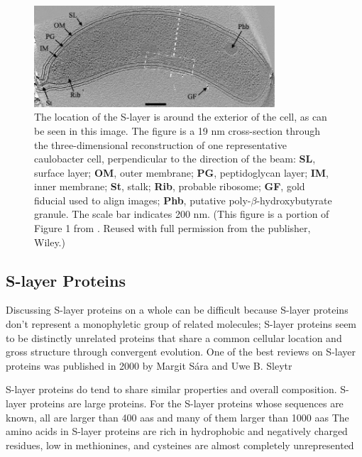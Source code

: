 \begin{figure}[htb]
  \begin{center}
    \includegraphics[width=0.8\textwidth]{intro/img/jensentomograph.jpg}
  \end{center}
  \caption[Electrotomograph of \ac{caulobacter}]{ The location of the \ac{S-layer} is around the
    exterior of the cell, as can be seen in this image. The figure is a 19 \si{\nano\meter}
    cross-section through the three-dimensional reconstruction of one representative
    \ac{caulobacter} cell, perpendicular to the direction of the beam: \textbf{SL}, surface layer;
    \textbf{OM}, outer membrane; \textbf{PG}, peptidoglycan layer; \textbf{IM}, inner membrane;
    \textbf{St}, stalk; \textbf{Rib}, probable ribosome; \textbf{GF}, gold fiducial used to align
    images; \textbf{Phb}, putative poly-$\beta$-hydroxybutyrate granule. The scale bar indicates 200 \si{\nano\meter}. (This figure is a portion of Figure 1 from . Reused
    with full permission from the publisher, Wiley.)}
  \label{fig:intro-tomo}
\end{figure}

\subsection{S-layer Proteins} \label{sub:intro-slayerproteins} %

Discussing \ac{S-layer} proteins on a whole can be difficult because \ac{S-layer} proteins don't represent a monophyletic group of related molecules; \ac{S-layer} proteins seem to be distinctly unrelated proteins that share a common cellular location and gross structure through convergent evolution. One of the best reviews on \ac{S-layer} proteins was published in 2000 by Margit S\'{a}ra and Uwe B. Sleytr 

\ac{S-layer} proteins do tend to share similar properties and overall composition. \ac{S-layer} proteins are large proteins. For the \ac{S-layer} proteins whose sequences are known, all are larger than 400 \acp{aa} and many of them larger than 1000 \acp{aa} The amino acids in \ac{S-layer} proteins are rich in hydrophobic and negatively charged residues, low in methionines, and  cysteines are almost completely unrepresented  

